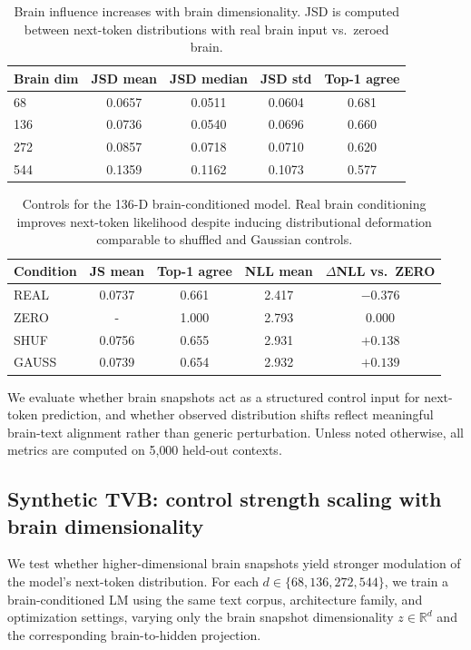 \documentclass{article}
\theoremstyle{plain}
\theoremstyle{definition}
\theoremstyle{remark}
\begin{document}
\begin{table}[t]
\centering
\caption{Brain influence increases with brain dimensionality. JSD is computed between next-token distributions with real brain input vs.\ zeroed brain.}
\label{tab:js_results}
\begin{tabular}{lcccc}
\toprule
Brain dim & JSD mean & JSD median & JSD std & Top-1 agree \\
\midrule
68  & 0.0657 & 0.0511 & 0.0604 & 0.681 \\
136 & 0.0736 & 0.0540 & 0.0696 & 0.660 \\
272 & 0.0857 & 0.0718 & 0.0710 & 0.620 \\
544 & 0.1359 & 0.1162 & 0.1073 & 0.577 \\
\bottomrule
\end{tabular}
\end{table}




\begin{table}
\centering
\caption{Controls for the 136-D brain-conditioned model.
Real brain conditioning improves next-token likelihood despite inducing distributional deformation comparable to shuffled and Gaussian controls.}
\label{tab:controls-136}
\begin{tabular}{lcccc}
\toprule
Condition & JS mean & Top-1 agree & NLL mean & $\Delta$NLL vs.\ ZERO \\
\midrule
REAL  & 0.0737 & 0.661 & 2.417 & $-0.376$ \\
ZERO  & -    & 1.000 & 2.793 & 0.000 \\
SHUF  & 0.0756 & 0.655 & 2.931 & $+0.138$ \\
GAUSS & 0.0739 & 0.654 & 2.932 & $+0.139$ \\
\bottomrule
\end{tabular}
\end{table}

We evaluate whether brain snapshots act as a structured control input for next-token prediction, and whether observed distribution shifts reflect meaningful brain-text alignment rather than generic perturbation. Unless noted otherwise, all metrics are computed on 5{,}000 held-out contexts.

\subsection{Synthetic TVB: control strength scaling with brain dimensionality}
\label{sec:dim}

We test whether higher-dimensional brain snapshots yield stronger modulation of the model's next-token distribution.
For each $d \in \{68,136,272,544\}$, we train a brain-conditioned LM using the same text corpus, architecture family, and optimization settings, varying only the brain snapshot dimensionality $z \in \mathbb{R}^d$ and the corresponding brain-to-hidden projection.
\end{document}
